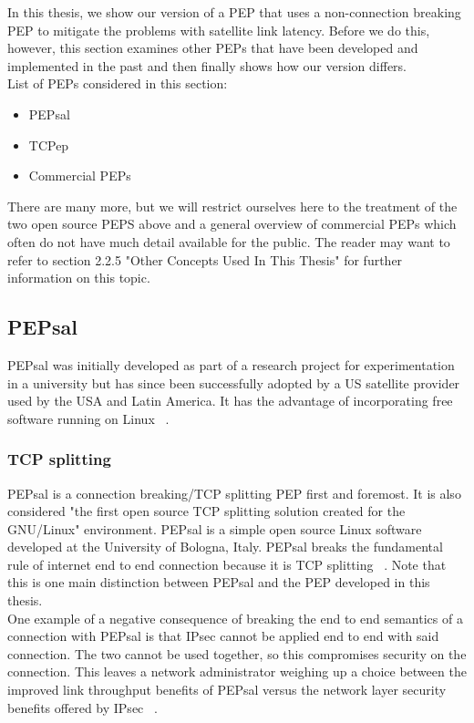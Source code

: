 In this thesis, we show our version of a PEP that uses a non-connection breaking PEP to mitigate the problems with satellite link latency. Before we do this, however, this section examines other PEPs that have been developed and implemented in the past and then finally shows how our version differs.\\
 
List of PEPs considered in this section:
 \begin{itemize}
 \item PEPsal
 \item TCPep
 \item Commercial PEPs
 \end{itemize}
There are many more, but we will restrict ourselves here to the treatment of the two open source PEPS above and a general overview of commercial PEPs which often do not have much detail available for the public. The reader may want to refer to section 2.2.5 "Other Concepts Used In This Thesis" for further information on this topic.

\subsection{PEPsal}
PEPsal was initially developed as part of a research project for experimentation in a university but has since been successfully adopted by a US satellite provider used by the USA and Latin America. It has the advantage of incorporating free software running on Linux ~\cite{14}.

\subsubsection*{TCP splitting}
PEPsal is a connection breaking/TCP splitting PEP first and foremost. It is also considered "the first open source TCP splitting solution created for the GNU/Linux" environment. PEPsal is a simple open source Linux software developed at the University of Bologna, Italy. PEPsal breaks the fundamental rule of internet end to end connection because it is TCP splitting ~\cite{14}. Note that this is one main distinction between PEPsal and the PEP developed in this thesis. \\

One example of a negative consequence of breaking the end to end semantics of a connection with PEPsal is that IPsec cannot be applied end to end with said connection. The two cannot be used together, so this compromises security on the connection. This leaves a network administrator weighing up a choice between the improved link throughput benefits of PEPsal versus the network layer security benefits offered by IPsec ~\cite{14}.

